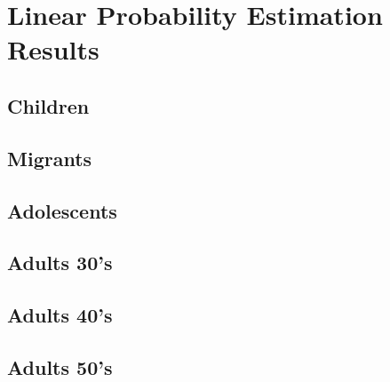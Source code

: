 \documentclass[12pt]{article}
\begin{document}
\appendix
\section{Linear Probability Estimation Results}
\subsection{Children}




\subsection{Migrants}




\subsection{Adolescents}




\subsection{Adults 30's}




\subsection{Adults 40's}




\subsection{Adults 50's}



\end{document}
